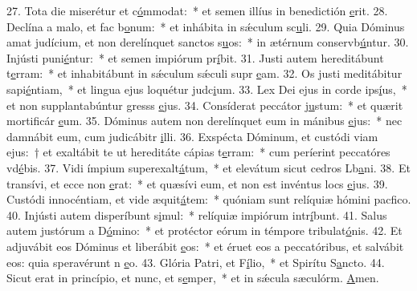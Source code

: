 27. Tota die miserétur et c\uline{ó}mmodat:~* et semen illíus in benedictión \uline{e}rit.
28. Declína a malo, et fac b\uline{o}num:~* et inhábita in sǽculum sc\uline{u}li.
29. Quia Dóminus amat judícium, et non derelínquet sanctos s\uline{u}os:~* in ætérnum conservb\uline{ú}ntur.
30. Injústi puni\uline{é}ntur:~* et semen impiórum pr\uline{í}bit.
31. Justi autem hereditábunt t\uline{e}rram:~* et inhabitábunt in sǽculum sǽculi supr \uline{e}am.
32. Os justi meditábitur sapi\uline{é}ntiam,~* et lingua ejus loquétur judc\uline{i}um.
33. Lex Dei ejus in corde ips\uline{í}us,~* et non supplantabúntur gresss \uline{e}jus.
34. Consíderat peccátor j\uline{u}stum:~* et quærit mortificár \uline{e}um.
35. Dóminus autem non derelínquet eum in mánibus \uline{e}jus:~* nec damnábit eum, cum judicábitr \uline{i}lli.
36. Exspécta Dóminum, et custódi viam ejus:~† et exaltábit te ut hereditáte cápias t\uline{e}rram:~* cum períerint peccatóres vd\uline{é}bis.
37. Vidi ímpium superexalt\uline{á}tum,~* et elevátum sicut cedros Lb\uline{a}ni.
38. Et transívi, et ecce non \uline{e}rat:~* et quæsívi eum, et non est invéntus locs \uline{e}jus.
39. Custódi innocéntiam, et vide æquit\uline{á}tem:~* quóniam sunt relíquiæ hómini pacf\uline{i}co.
40. Injústi autem disperíbunt s\uline{i}mul:~* relíquiæ impiórum intr\uline{í}bunt.
41. Salus autem justórum a D\uline{ó}mino:~* et protéctor eórum in témpore tribulat\uline{ó}nis.
42. Et adjuvábit eos Dóminus et liberábit \uline{e}os:~* et éruet eos a peccatóribus, et salvábit eos: quia speravérunt n \uline{e}o.
43. Glória Patri, et F\uline{í}lio,~* et Spirítu S\uline{a}ncto.
44. Sicut erat in princípio, et nunc, et s\uline{e}mper,~* et in sǽcula sæculórm. \uline{A}men.

